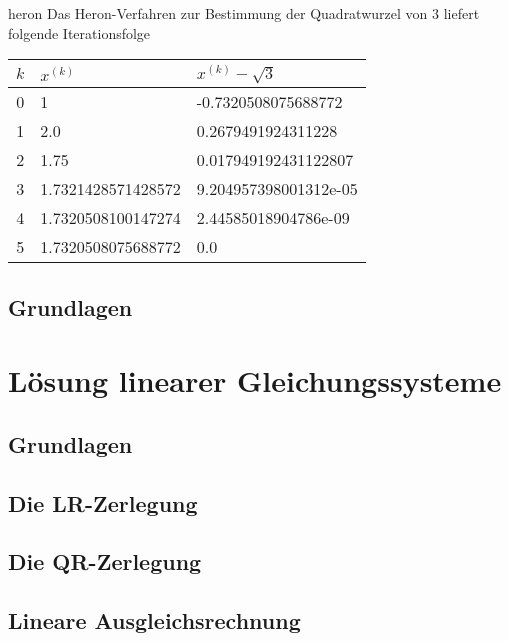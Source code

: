 \begin{Beispiel}{heron}
  Das Heron-Verfahren zur Bestimmung der Quadratwurzel von 3 liefert
  folgende Iterationsfolge
  \begin{center}
    \begin{tabular}{c|ll}
      $k$ & $x^{(k)}$ & $x^{(k)} - \sqrt3$\\\hline
      0  &  1  &  -0.7320508075688772 \\
      1  &  2.0  &  0.2679491924311228 \\
      2  &  1.75  &  0.017949192431122807 \\
      3  &  1.7321428571428572  &  9.204957398001312e-05 \\
      4  &  1.7320508100147274  &  2.44585018904786e-09 \\
      5  &  1.7320508075688772  &  0.0
    \end{tabular}
  \end{center}
\end{Beispiel}

\section{Grundlagen}




%


\chapter{Lösung linearer Gleichungssysteme}

\section{Grundlagen}


\section{Die LR-Zerlegung}


\section{Die QR-Zerlegung}


\section{Lineare Ausgleichsrechnung}




\printindex

